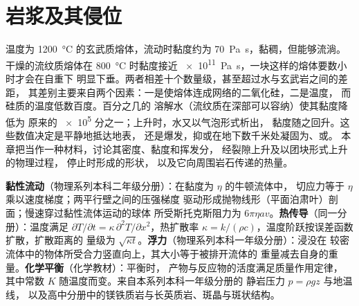 \chapter{岩浆及其侵位}\label{ch:b2:magma-emplacement}

温度为 \qty{1200}{\celsius} 的玄武质熔体，流动时黏度约为
\qty{70}{Pa.s}，黏稠，但能够流淌。干燥的流纹质熔体在 \qty{800}{\celsius}
时黏度接近 \qty{e11}{Pa.s}，一块这样的熔体要数小时才会在自重下
明显下垂。两者相差十个数量级，甚至超过水与玄武岩之间的差距，
其差别主要来自两个因素：一是使熔体连成网络的二氧化硅，二是温度，
而硅质的温度低数百度。百分之几的
溶解水（流纹质在深部可以容纳）使其黏度降低为
原来的 \num{e5} 分之一；上升时，水又以气泡形式析出，
黏度随之回升。这些数值决定是平静地抵达地表，
还是爆发，抑或在地下数千米处凝固为、或。
本章把当作一种材料，讨论其密度、黏度和挥发分，
经裂隙上升及以团块形式上升的物理过程，
停止时形成的形状，
以及它向周围岩石传递的热量。

\begin{recall}
\textbf{黏性流动}（物理系列本科二年级分册）：在黏度为 $\eta$ 的牛顿流体中，
切应力等于 $\eta$ 乘以速度梯度；两平行壁之间的压强梯度
驱动形成抛物线形（平面泊肃叶）剖面；慢速穿过黏性流体运动的球体
所受斯托克斯阻力为
$6\pi\eta a v$。\textbf{热传导}（同一分册）：温度满足
$\partial T/\partial t = \kappa\,\partial^2T/\partial x^2$，热扩散率 $\kappa = k/(\rho
c)$，温度阶跃按误差函数扩散，扩散距离的
量级为 $\sqrt{\kappa t}$。\textbf{浮力}（物理系列本科一年级分册）：浸没在
较密流体中的物体所受合力竖直向上，其大小等于被排开流体的
重量减去自身的重量。\textbf{化学平衡}（化学教材）：平衡时，
产物与反应物的活度满足质量作用定律，
其中常数 $K$ 随温度而变。来自本系列本科一年级分册的
静岩压力 $p = \rho g z$ 与地温线，
以及高中分册中的镁铁质岩与长英质岩、斑晶与斑状结构。
\end{recall}

